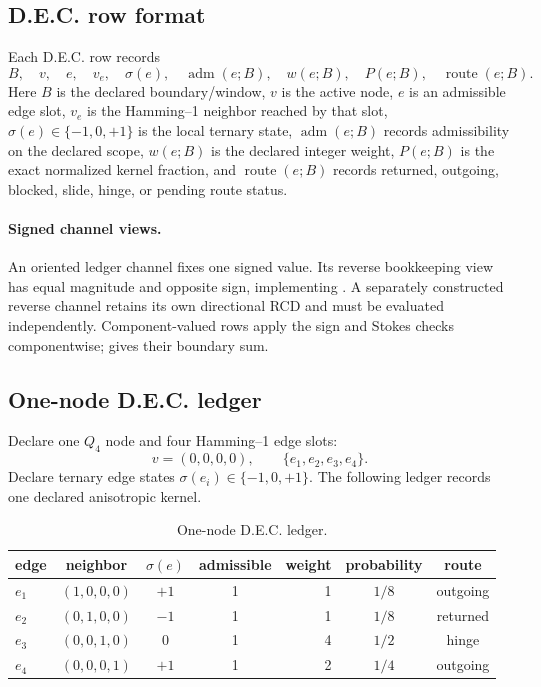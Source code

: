 \subsection{D.E.C. row format}\label{manual:dec-ledger:row-format}
Each D.E.C. row records
\[
B,
\quad
v,
\quad
e,
\quad
v_e,
\quad
\sigma(e),
\quad
\operatorname{adm}(e;B),
\quad
w(e;B),
\quad
P(e;B),
\quad
\operatorname{route}(e;B).
\]
Here \(B\) is the declared boundary/window, \(v\) is the active node, \(e\) is an admissible edge slot, \(v_e\) is the Hamming--1 neighbor reached by that slot, \(\sigma(e)\in\{-1,0,+1\}\) is the local ternary state, \(\operatorname{adm}(e;B)\) records admissibility on the declared scope, \(w(e;B)\) is the declared integer weight, \(P(e;B)\) is the exact normalized kernel fraction, and \(\operatorname{route}(e;B)\) records returned, outgoing, blocked, slide, hinge, or pending route status.

\paragraph{Signed channel views.}
An oriented ledger channel fixes one signed value. Its reverse bookkeeping
view has equal magnitude and opposite sign, implementing
. A separately constructed
reverse channel retains its own directional RCD and must be evaluated
independently. Component-valued rows apply the sign and Stokes checks
componentwise;  gives their boundary sum.

\subsection{One-node D.E.C. ledger}\label{manual:dec-ledger:one-node}
Declare one \(Q_4\) node and four Hamming--1 edge slots:
\[
v=(0,0,0,0),
\qquad
\{e_1,e_2,e_3,e_4\}.
\]
Declare ternary edge states \(\sigma(e_i)\in\{-1,0,+1\}\). The following ledger records one declared anisotropic kernel.
\begin{table}[H]
\centering
\scriptsize
\caption{One-node D.E.C. ledger.}
\begin{tabular}{l c c c r c c}
\toprule
edge & neighbor & $\sigma(e)$ & admissible & weight & probability & route\\
\midrule
$e_1$ & $(1,0,0,0)$ & $+1$ & 1 & 1 & $1/8$ & outgoing\\
$e_2$ & $(0,1,0,0)$ & $-1$ & 1 & 1 & $1/8$ & returned\\
$e_3$ & $(0,0,1,0)$ & $0$ & 1 & 4 & $1/2$ & hinge\\
$e_4$ & $(0,0,0,1)$ & $+1$ & 1 & 2 & $1/4$ & outgoing\\
\bottomrule
\end{tabular}
\label{tab:manual-dec-one-node-ledger}
\end{table}

